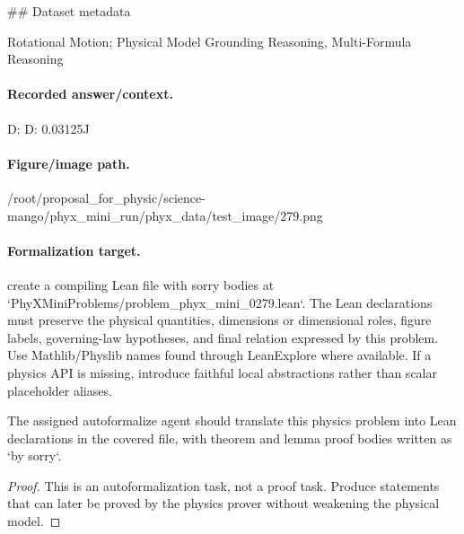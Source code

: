 \#\# Dataset metadata

Rotational Motion; Physical Model Grounding Reasoning, Multi-Formula Reasoning

\paragraph{Recorded answer/context.}
D: D: 0.03125J

\paragraph{Figure/image path.}
/root/proposal\_for\_physic/science-mango/phyx\_mini\_run/phyx\_data/test\_image/279.png

\paragraph{Formalization target.}
create a compiling Lean file with sorry bodies at `PhyXMiniProblems/problem\_phyx\_mini\_0279.lean`. The Lean declarations must preserve the physical quantities, dimensions or dimensional roles, figure labels, governing-law hypotheses, and final relation expressed by this problem.
Use Mathlib/Physlib names found through LeanExplore where available. If a physics API is missing, introduce faithful local abstractions rather than scalar placeholder aliases.

\begin{theorem}
\label{thm:physics:phyx_mini_0279:target}
The assigned autoformalize agent should translate this physics problem into Lean declarations in the covered file, with theorem and lemma proof bodies written as `by sorry`.
\end{theorem}
\begin{proof}
This is an autoformalization task, not a proof task. Produce statements that can later be proved by the physics prover without weakening the physical model.
\end{proof}

